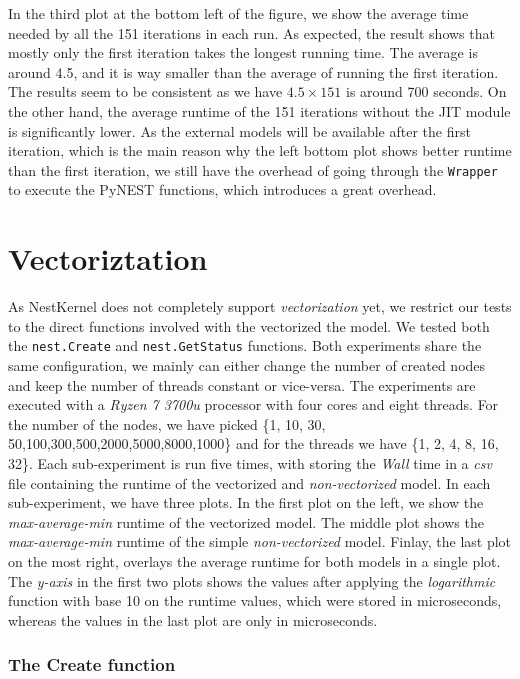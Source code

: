 In the third plot at the bottom left of the figure, we show the average time needed by all the 151 iterations in each run. As expected, the result shows that mostly only the first iteration takes the longest running time. The average is around 4.5, and it is way smaller than the average of running the first iteration. The results seem to be consistent as we have $4.5 \times 151$ is around 700 seconds. On the other hand, the average runtime of the 151 iterations without the JIT module is significantly lower. As the external models will be available after the first iteration, which is the main reason why the left bottom plot shows better runtime than the first iteration, we still have the overhead of going through the \texttt{Wrapper} to execute the PyNEST functions, which introduces a great overhead.



\section{Vectoriztation}

As NestKernel does not completely support \emph	{vectorization} yet, we restrict our tests to the direct functions involved with the vectorized the model. We tested both the \texttt{nest.Create} and \texttt{nest.GetStatus} functions. Both experiments share the same configuration, we mainly can either change the number of created nodes and keep the number of threads constant or vice-versa. The experiments are executed with a \emph{Ryzen 7 3700u} processor with four cores and eight threads.
For the number of the nodes, we have picked \{1, 10, 30, 50,100,300,500,2000,5000,8000,1000\} and for the threads we have \{1, 2, 4, 8, 16, 32\}. Each sub-experiment is run five times, with storing the \emph{Wall} time in a \emph{csv} file containing the runtime of the vectorized and \emph{non-vectorized} model. In each sub-experiment, we have three plots. In the first plot on the left, we show the \emph{max-average-min} runtime of the vectorized model. The middle plot shows the \emph{max-average-min} runtime of the simple \emph{non-vectorized} model. Finlay, the last plot on the most right, overlays the average runtime for both models in a single plot. The \emph{y-axis} in the first two plots shows the values after applying the \emph{logarithmic} function with base 10 on the runtime values, which were stored in microseconds, whereas the values in the last plot are only in microseconds.

\subsubsection{The Create function}

